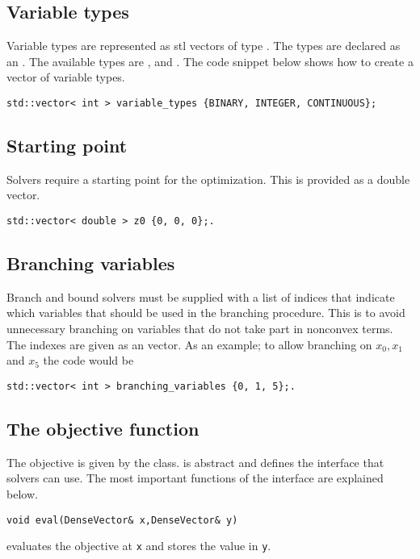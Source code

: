 \subsection{Variable types}
Variable types are represented as stl vectors of type . The types are declared as an . The available types are ,  and . The code snippet below shows how to create a vector of variable types.
\begin{lstlisting}
std::vector< int > variable_types {BINARY, INTEGER, CONTINUOUS};
\end{lstlisting}

\subsection{Starting point}
Solvers require a starting point for the optimization. This is provided as a double vector.
\begin{lstlisting}
std::vector< double > z0 {0, 0, 0};.
\end{lstlisting}

\subsection{Branching variables}
Branch and bound solvers must be supplied with a list of indices that indicate which variables that should be used in the branching procedure. This is to avoid unnecessary branching on variables that do not take part in nonconvex terms. 
The indexes are given as an  vector. As an example; to allow branching on $x_{0}, x_{1}$ and $x_{5}$ the code would be
\begin{lstlisting}
std::vector< int > branching_variables {0, 1, 5};.
\end{lstlisting}

\subsection{The objective function}
The objective is given by the  class.  is abstract and defines the interface that solvers can use. The most important functions of the interface are explained below.

\begin{lstlisting}
void eval(DenseVector& x,DenseVector& y)
\end{lstlisting}
evaluates the objective at \texttt{x} and stores the value in \texttt{y}.


